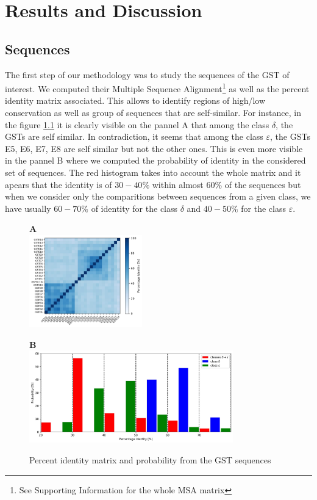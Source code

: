 \chapter{Results and Discussion}

\section{Sequences}
\noindent The first step of our methodology was to study the sequences of the GST of interest. We computed their Multiple Sequence Alignment\footnote{See Supporting Information for the whole MSA matrix} as well as the percent identity matrix associated. This allows to identify regions of high/low conservation as well as group of sequences that are self-similar. For instance, in the figure \ref{Sequence and Structure matricies} it is clearly visible on the pannel A that among the class $\delta$, the GSTs are self similar. In contradiction, it seems that among the class $\varepsilon$, the GSTs E5, E6, E7, E8 are self similar but not the other ones. This is even more visible in the pannel B where we computed the probability  of identity in the considered set of sequences. The red histogram takes into account the whole matrix and it apears that the identity is of $30-40\%$ within almost $60\%$ of the sequences but when we consider only the comparitions between sequences from a given class, we have usually $60-70\%$ of identity for the class $\delta$ and $40-50\%$ for the class $\varepsilon$. 

\begin{figure}[H]
	\label{Sequence and Structure matricies}
	\begin{minipage}{.33\linewidth}
		\textbf{A}\\
		\includegraphics[height = 4cm]{figures/PercentID_matrix.jpg}
	\end{minipage}
	\begin{minipage}{.65\linewidth}
		\textbf{B}\\
		\includegraphics[height = 4cm]{figures/PercentID_proba.jpg}
	\end{minipage}
	\caption{Percent identity matrix and probability from the GST sequences}
\end{figure}

